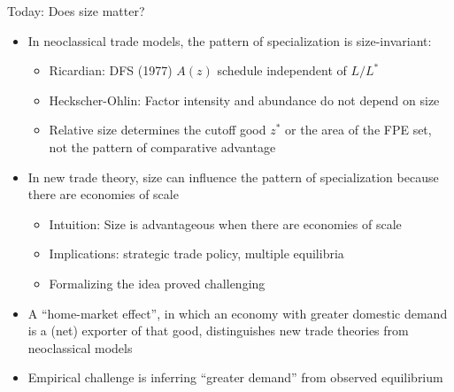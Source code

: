 \documentclass[10pt,notes=hide]{beamer}
\begin{document}
\begin{frame}{Today: Does size matter?}
\linespread{1.1}
\begin{itemize}
	\item In neoclassical trade models, the pattern of specialization is size-invariant:
	\begin{itemize}
		\item Ricardian: DFS (1977) $A(z)$ schedule independent of $L/L^{*}$
		\item Heckscher-Ohlin: Factor intensity and abundance do not depend on size 
		\item Relative size determines the cutoff good $z^{*}$ or the area of the FPE set, not the pattern of comparative advantage
	\end{itemize}
	\item In new trade theory, size can influence the pattern of specialization because there are economies of scale
\begin{itemize}
	\item Intuition: Size is advantageous when there are economies of scale
	\item Implications: strategic trade policy, multiple equilibria
	\item Formalizing the idea proved challenging
\end{itemize}
	\item A ``home-market effect'', in which an economy with greater domestic demand is a (net) exporter of that good, distinguishes new trade theories from neoclassical models
	\item Empirical challenge is inferring ``greater demand'' from observed equilibrium
\end{itemize}
\end{frame}
\end{document}

